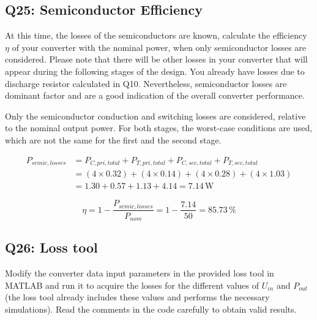 \documentclass{PELsmallreport}
\begin{document}
\subsection{Q25: Semiconductor Efficiency} 
At this time, the losses of the semiconductors are known, calculate the efficiency $\eta$ of your converter with the nominal power, when only semiconductor losses are considered. Please note that there will be other losses in your converter that will appear during the following stages of the design. You already have losses due to discharge resistor calculated in Q10.  Nevertheless, semiconductor losses are dominant factor and are a good indication of the overall converter performance.

\begin{framed}
  \vspace{2em}
  Only the semiconductor conduction and switching losses are considered, relative to the nominal output power. For both stages, the worst-case conditions are used, which are not the same for the first and the second stage.
 
\begin{align}
    P_{semic,losses} &= P_{C,pri,total} + P_{T,pri,total} + P_{C,sec,total} + P_{T,sec,total} \\
    &= (4\times0.32) + (4\times0.14) + (4\times0.28) + (4\times1.03) \\
    &= 1.30 + 0.57 + 1.13 + 4.14 = 7.14\,\text{W}
\end{align}
 
\begin{equation}
    \eta = 1 - \frac{P_{semic,losses}}{P_{nom}} = 1 - \frac{7.14}{50} = 85.73\,\%
\end{equation}
  \vspace{2em}
\end{framed}

 \hfill{}

\subsection{Q26: Loss tool}
Modify the converter data input parameters in the provided loss tool in MATLAB and run it to acquire the losses for the different values of $U_{in}$ and $P_{out}$ (the loss tool already includes these values and performs the necessary simulations). Read the comments in the code carefully to obtain valid results.\\
\end{document}
